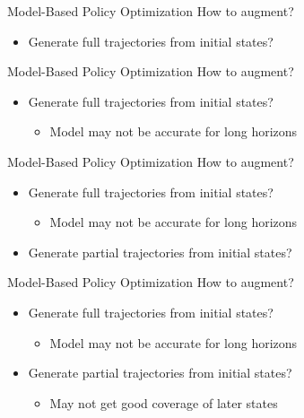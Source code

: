 \begin{frame}{Model-Based Policy Optimization}
\vspace{1em}
How to augment?
\begin{itemize}
    \item Generate full trajectories from initial states?
\end{itemize}
\end{frame}

\begin{frame}{Model-Based Policy Optimization}
\vspace{1em}
How to augment?
\begin{itemize}
    \item Generate full trajectories from initial states?
    \begin{itemize}
        \item Model may not be accurate for long horizons
    \end{itemize}
\end{itemize}
\end{frame}

\begin{frame}{Model-Based Policy Optimization}
\vspace{1em}
How to augment?
\begin{itemize}
    \item Generate full trajectories from initial states?
    \begin{itemize}
        \item Model may not be accurate for long horizons
    \end{itemize}
    \item Generate partial trajectories from initial states?
\end{itemize}
\end{frame}

\begin{frame}{Model-Based Policy Optimization}
\vspace{1em}
How to augment?
\begin{itemize}
    \item Generate full trajectories from initial states?
    \begin{itemize}
        \item Model may not be accurate for long horizons
    \end{itemize}
    \item Generate partial trajectories from initial states?
    \begin{itemize}
        \item May not get good coverage of later states
    \end{itemize}
\end{itemize}
\end{frame}

